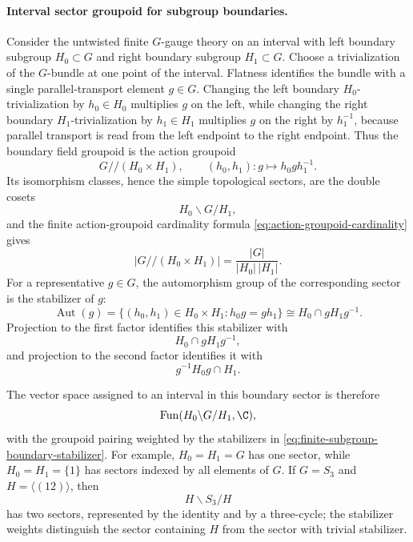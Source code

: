 \paragraph{Interval sector groupoid for subgroup boundaries.}
\label{par:finite-subgroup-boundary-double-cosets}
Consider the untwisted finite \(G\)-gauge theory on an interval with left
boundary subgroup \(H_0\subset G\) and right boundary subgroup \(H_1\subset G\).
Choose a trivialization of the \(G\)-bundle at one point of the interval.
Flatness identifies the bundle with a single parallel-transport element
\(g\in G\).  Changing the left boundary \(H_0\)-trivialization by
\(h_0\in H_0\) multiplies \(g\) on the left, while changing the right boundary
\(H_1\)-trivialization by \(h_1\in H_1\) multiplies \(g\) on the right by
\(h_1^{-1}\), because parallel transport is read from the left endpoint to
the right endpoint.  Thus the boundary field groupoid is the action groupoid
\[
  G//(H_0\times H_1),
  \qquad
  (h_0,h_1):g\longmapsto h_0 g h_1^{-1}.
\]
Its isomorphism classes, hence the simple topological sectors, are the double
cosets
\begin{equation}
  H_0\backslash G/H_1,
  \label{eq:finite-subgroup-boundary-double-cosets}
\end{equation}
and the finite action-groupoid cardinality formula
\eqref{eq:action-groupoid-cardinality} gives
\begin{equation}
  \bigl|G//(H_0\times H_1)\bigr|
  =
  \frac{|G|}{|H_0|\,|H_1|}.
  \label{eq:finite-subgroup-boundary-groupoid-cardinality}
\end{equation}
For a representative \(g\in G\), the automorphism group of the corresponding
sector is the stabilizer of \(g\):
\begin{equation}
  \operatorname{Aut}(g)
  =
  \{(h_0,h_1)\in H_0\times H_1:h_0g=gh_1\}
  \cong H_0\cap gH_1g^{-1}.
  \label{eq:finite-subgroup-boundary-stabilizer}
\end{equation}
Projection to the first factor identifies this stabilizer with
\[
  H_0\cap gH_1g^{-1},
\]
and projection to the second factor identifies it with
\[
  g^{-1}H_0g\cap H_1.
\]

The vector space assigned to an interval in this boundary sector is therefore
\[
  \operatorname{Fun}(H_0\backslash G/H_1,\C),
\]
with the groupoid pairing weighted by the stabilizers in
\eqref{eq:finite-subgroup-boundary-stabilizer}.  For example, \(H_0=H_1=G\)
has one sector, while \(H_0=H_1=\{1\}\) has sectors indexed by all elements of
\(G\).  If \(G=S_3\) and \(H=\langle(12)\rangle\), then
\[
  H\backslash S_3/H
\]
has two sectors, represented by the identity and by a three-cycle; the
stabilizer weights distinguish the sector containing \(H\) from the sector
with trivial stabilizer.

